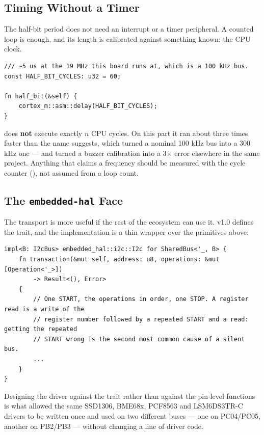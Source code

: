\subsection{Timing Without a Timer}

The half-bit period does not need an interrupt or a timer peripheral. A counted loop is
enough, and its length is calibrated against something known: the CPU clock.

\begin{verbatim}
/// ~5 us at the 19 MHz this board runs at, which is a 100 kHz bus.
const HALF_BIT_CYCLES: u32 = 60;

fn half_bit(&self) {
    cortex_m::asm::delay(HALF_BIT_CYCLES);
}
\end{verbatim}

\begin{warningbox}
     does \textbf{not} execute exactly $n$ CPU cycles.
    On this part it ran about three times faster than the name suggests, which turned a
    nominal 100 kHz bus into a 300 kHz one — and turned a buzzer calibration into a 3$\times$
    error elsewhere in the same project. Anything that claims a frequency should be measured
    with the cycle counter (), not assumed from a loop count.
\end{warningbox}

\subsection{The \texttt{embedded-hal} Face}

The transport is more useful if the rest of the ecosystem can use it. 
v1.0 defines the trait, and the implementation is a thin wrapper over the primitives above:

\begin{verbatim}
impl<B: I2cBus> embedded_hal::i2c::I2c for SharedBus<'_, B> {
    fn transaction(&mut self, address: u8, operations: &mut [Operation<'_>])
        -> Result<(), Error>
    {
        // One START, the operations in order, one STOP. A register read is a write of the
        // register number followed by a repeated START and a read: getting the repeated
        // START wrong is the second most common cause of a silent bus.
        ...
    }
}
\end{verbatim}

Designing the driver against the trait rather than against the pin-level functions is what
allowed the same SSD1306, BME68x, PCF8563 and LSM6DS3TR-C drivers to be written once and
used on two different buses — one on PC04/PC05, another on PB2/PB3 — without changing a line
of driver code.

